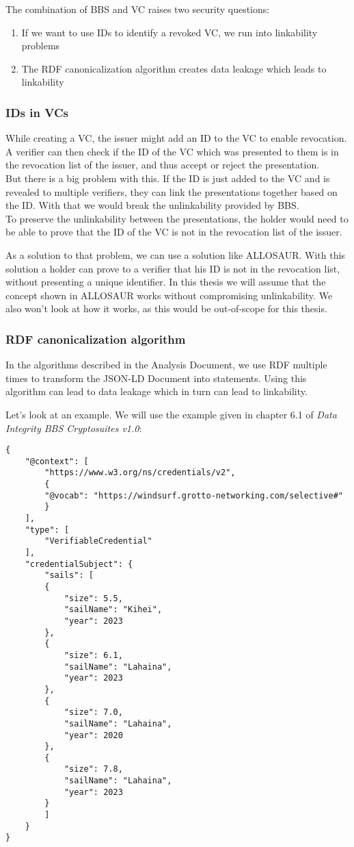 \documentclass[
	a4paper               %
	,bibliography=totoc   %
	,listof=totoc         %
	,monolingual
]{bfhthesis}              %
\begin{document}
\label{subsec:vcseccons}
The combination of BBS and VC raises two security questions:
\begin{enumerate}
	\item If we want to use IDs to identify a revoked VC, we run into linkability problems
	\item The RDF canonicalization algorithm creates data leakage which leads to linkability
\end{enumerate}

\subsubsection{IDs in VCs}
While creating a VC, the issuer might add an ID to the VC to enable revocation.
A verifier can then check if the ID of the VC which was presented to them is in the revocation list of the issuer, and thus accept or reject the presentation.\\
But there is a big problem with this.
If the ID is just added to the VC and is revealed to multiple verifiers, they can link the presentations together based on the ID.
With that we would break the unlinkability provided by BBS.\\

To preserve the unlinkability between the presentations, the holder would need to be able to prove that the ID of the VC is not in the revocation list of the issuer.

As a solution to that problem, we can use a solution like ALLOSAUR\cite{allosaur}. 
With this solution a holder can prove to a verifier that his ID is not in the revocation list, without presenting a unique identifier.
In this thesis we will assume that the concept shown in ALLOSAUR works without compromising unlinkability.
We also won't look at how it works, as this would be out-of-scope for this thesis.

\subsubsection{RDF canonicalization algorithm}
In the algorithms described in the Analysis Document, we use RDF multiple times to transform the JSON-LD Document into statements.
Using this algorithm can lead to data leakage which in turn can lead to linkability.

Let's look at an example.
We will use the example given in chapter 6.1 of \textit{Data Integrity BBS Cryptosuites v1.0}\cite{bbsvc}:

\begin{lstlisting}[language=canon,firstnumber=1,caption={Example: Sails VC},captionpos=b]
{
	"@context": [
		"https://www.w3.org/ns/credentials/v2",
		{
		"@vocab": "https://windsurf.grotto-networking.com/selective#"
		}
	],
	"type": [
		"VerifiableCredential"
	],
	"credentialSubject": {
		"sails": [
		{
			"size": 5.5,
			"sailName": "Kihei",
			"year": 2023
		},
		{
			"size": 6.1,
			"sailName": "Lahaina",
			"year": 2023
		},
		{
			"size": 7.0,
			"sailName": "Lahaina",
			"year": 2020
		},
		{
			"size": 7.8,
			"sailName": "Lahaina",
			"year": 2023
		}
		]
	}
}
\end{lstlisting}
\end{document}
